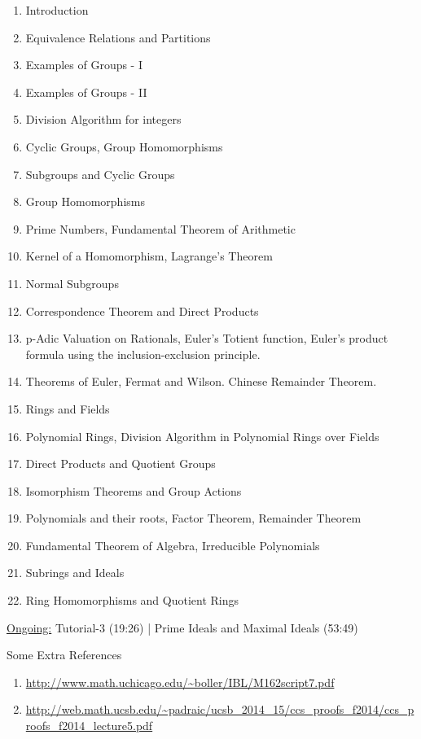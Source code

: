 \begin{enumerate}
    \item Introduction
    \item Equivalence Relations and Partitions
    \item Examples of Groups - I
    \item Examples of Groups - II
    \item Division Algorithm for integers
    \item Cyclic Groups, Group Homomorphisms
    \item Subgroups and Cyclic Groups
    \item Group Homomorphisms
    \item Prime Numbers, Fundamental Theorem of Arithmetic
    \item Kernel of a Homomorphism, Lagrange's Theorem
    \item Normal Subgroups
    \item Correspondence Theorem and Direct Products
    \item p-Adic Valuation on Rationals, Euler's Totient function, Euler's product formula using the inclusion-exclusion principle.
    \item Theorems of Euler, Fermat and Wilson. Chinese Remainder Theorem.
    \item Rings and Fields
    \item Polynomial Rings, Division Algorithm in Polynomial Rings over Fields
    \item Direct Products and Quotient Groups
    \item Isomorphism Theorems and Group Actions
    \item Polynomials and their roots, Factor Theorem, Remainder Theorem
    \item Fundamental Theorem of Algebra, Irreducible Polynomials
    \item Subrings and Ideals
    \item Ring Homomorphisms and Quotient Rings
\end{enumerate}

\underline{Ongoing:} Tutorial-3 (19:26) | Prime Ideals and Maximal Ideals (53:49)

\medskip

Some Extra References 
\begin{enumerate}
    \item \url{http://www.math.uchicago.edu/~boller/IBL/M162script7.pdf}
    \item \url{http://web.math.ucsb.edu/~padraic/ucsb_2014_15/ccs_proofs_f2014/ccs_proofs_f2014_lecture5.pdf}
\end{enumerate}